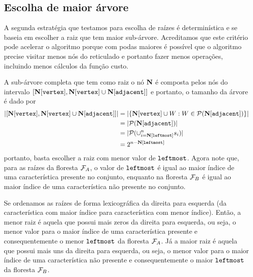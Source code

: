\subsection{Escolha de maior árvore}
A segunda estratégia que testamos para escolha de raízes é 
determinística e se baseia em escolher a raiz que tem maior 
sub-árvore. Acreditamos que este critério pode acelerar o algoritmo
porque com podas maiores é possível que o algoritmo precise visitar 
menos nós do reticulado e portanto fazer menos operações, incluindo 
menos cálculos da função custo.

A sub-árvore completa que tem como raiz o nó $\mathbf N$ é composta 
pelos nós do intervalo 
$[\mathbf N[\texttt{vertex}], \mathbf N[\texttt{vertex}] \cup \mathbf N[\texttt{adjacent}]]$ e 
portanto, o tamanho da árvore é dado por
\begin{align*}
|[\mathbf N[\texttt{vertex}], \mathbf N[\texttt{vertex}] \cup \mathbf N[\texttt{adjacent}]]| &= 
|\{\mathbf N[\texttt{vertex}] \cup W : W \in \mathcal{P} (\mathbf N[\texttt{adjacent}])\}| \\
    &= |\mathcal{P}(\mathbf N[\texttt{adjacent}])| \\
    &= |\mathcal{P}(\cup_{i = \mathbf N[\texttt{leftmost}]}^{n} s_i)| \\
    &= 2^{n - \mathbf N[\texttt{leftmost}]} 
\end{align*}
portanto, basta escolher a raiz com menor valor de $\texttt{leftmost}$.
Agora note que, para as raízes da floresta $\mathcal{F}_A$, o valor de 
$\texttt{leftmost}$ é igual ao maior índice de uma característica
presente no conjunto, enquanto na floresta $\mathcal{F}_B$ é igual ao maior
índice de uma característica não presente no conjunto.

Se ordenamos as raízes de forma lexicográfica da direita
para esquerda (da característica com maior índice para característica
com menor índice). Então, a menor raiz é aquela que possui mais zeros
da direita para esquerda, ou seja, o menor valor para o maior índice
de uma característica presente e consequentemente o menor 
$\texttt{leftmost}$ da floresta $\mathcal{F}_A$. Já a maior raiz é aquela 
que possui mais uns da direita para esquerda, ou seja, o menor valor 
para o maior índice de uma característica não presente e 
consequentemente o maior $\texttt{leftmost}$ da floresta $\mathcal{F}_B$.


